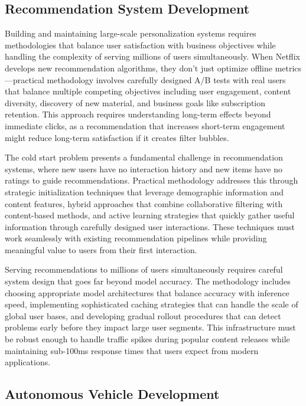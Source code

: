 \subsection{Recommendation System Development}

Building and maintaining large-scale personalization systems requires methodologies that balance user satisfaction with business objectives while handling the complexity of serving millions of users simultaneously. When Netflix develops new recommendation algorithms, they don't just optimize offline metrics—practical methodology involves carefully designed A/B tests with real users that balance multiple competing objectives including user engagement, content diversity, discovery of new material, and business goals like subscription retention. This approach requires understanding long-term effects beyond immediate clicks, as a recommendation that increases short-term engagement might reduce long-term satisfaction if it creates filter bubbles.

The cold start problem presents a fundamental challenge in recommendation systems, where new users have no interaction history and new items have no ratings to guide recommendations. Practical methodology addresses this through strategic initialization techniques that leverage demographic information and content features, hybrid approaches that combine collaborative filtering with content-based methods, and active learning strategies that quickly gather useful information through carefully designed user interactions. These techniques must work seamlessly with existing recommendation pipelines while providing meaningful value to users from their first interaction.

Serving recommendations to millions of users simultaneously requires careful system design that goes far beyond model accuracy. The methodology includes choosing appropriate model architectures that balance accuracy with inference speed, implementing sophisticated caching strategies that can handle the scale of global user bases, and developing gradual rollout procedures that can detect problems early before they impact large user segments. This infrastructure must be robust enough to handle traffic spikes during popular content releases while maintaining sub-100ms response times that users expect from modern applications.

\subsection{Autonomous Vehicle Development}

